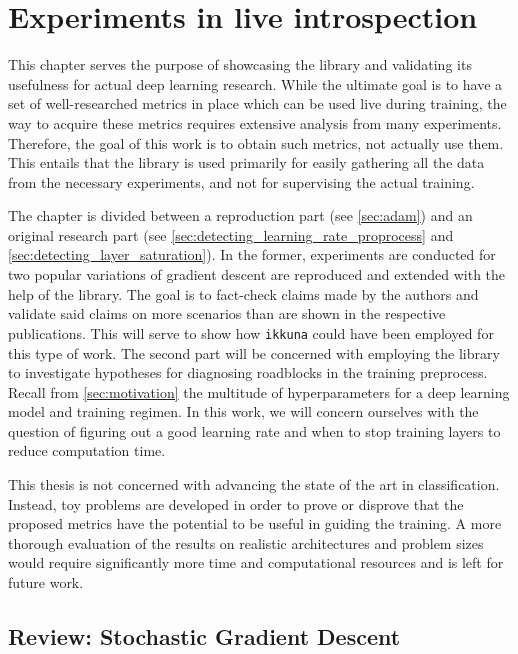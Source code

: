 \chapter{Experiments in live introspection}
\label{ch:experiments}

This chapter serves the purpose of showcasing the library and validating its
usefulness for actual deep learning research. While the ultimate goal is to have
a set of well-researched metrics in place which can be used live during
training, the way to acquire these metrics requires extensive analysis from many
experiments. Therefore, the goal of this work is to obtain such metrics, not
actually use them. This entails that the library is used primarily for easily
gathering all the data from the necessary experiments, and not for supervising
the actual training.

The chapter is divided between a reproduction part (see
\cref{sec:adam}) and an original research part (see
\cref{sec:detecting_learning_rate_proprocess} and
\cref{sec:detecting_layer_saturation}). In the former, experiments are conducted
for two popular variations of gradient descent are reproduced and extended with
the help of the library. The goal is to fact-check claims made by the authors
and validate said claims on more scenarios than are shown in the respective
publications. This will serve to show how \texttt{ikkuna} could have been
employed for this type of work. The second part will be concerned with employing
the library to investigate hypotheses for diagnosing roadblocks in the training
preprocess. Recall from \cref{sec:motivation} the multitude of hyperparameters
for a deep learning model and training regimen. In this work, we will concern
ourselves with the question of figuring out a good learning rate and when to
stop training layers to reduce computation time.

This thesis is not concerned with advancing the state of the art in
classification. Instead, toy problems are developed in order to prove or
disprove that the proposed metrics have the potential to be useful in guiding
the training. A more thorough evaluation of the results on realistic
architectures and problem sizes would require significantly more time and
computational resources and is left for future work.

\section{Review: Stochastic Gradient Descent}%
\label{sec:review_stochastic_gradient_descent}

